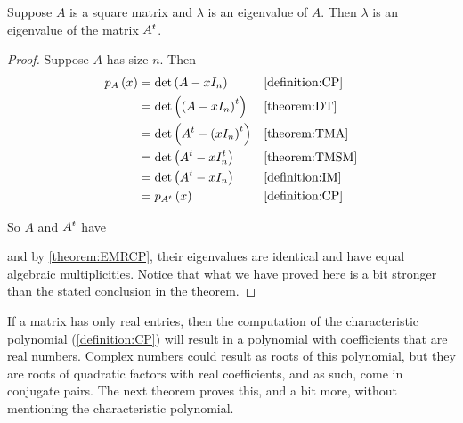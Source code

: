 \documentclass{ximera}
\begin{document}
\begin{theorem}
\label{theorem:ETM}


Suppose $A$ is a square matrix and $\lambda$ is an eigenvalue of $A$.  Then $\lambda$ is an eigenvalue of the matrix $A^{t}$.


\begin{proof}
Suppose $A$ has size $n$.  Then
\begin{align*}
p_{A}\left(x\right)
&=\det\left(A-xI_n\right)&&\ref{definition:CP}\\
&=\det\left(\left(A-xI_n\right)^{t}\right)&&\ref{theorem:DT}\\
&=\det\left(A^{t}-\left(xI_n\right)^{t}\right)&&\ref{theorem:TMA}\\
&=\det\left(A^{t}-xI_n^{t}\right)&&\ref{theorem:TMSM}\\
&=\det\left(A^{t}-xI_n\right)&&\ref{definition:IM}\\
&=p_{A^{t}}\left(x\right)&&\ref{definition:CP}\\
\end{align*}


So $A$ and $A^{t}$ have 
\begin{multipleChoice}
\end{multipleChoice}
and by \ref{theorem:EMRCP}, their eigenvalues are identical and have
equal algebraic multiplicities.  Notice that what we have proved here
is a bit stronger than the stated conclusion in the theorem.

\end{proof}
\end{theorem}

If a matrix has only real entries, then the computation of the characteristic polynomial (\ref{definition:CP}) will result in a polynomial with coefficients that are real numbers.  Complex numbers could result as roots of this polynomial, but they are roots of quadratic factors with real coefficients, and as such, come in conjugate pairs.  The next theorem proves this, and a bit more, without mentioning the characteristic polynomial.
\end{document}
